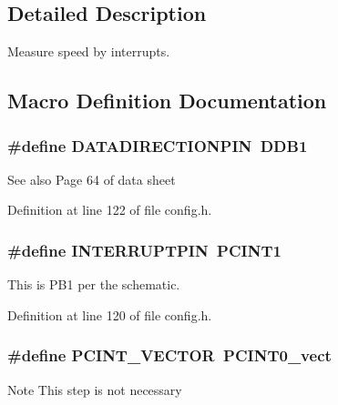 \subsection{Detailed Description}
Measure speed by interrupts. 



\subsection{Macro Definition Documentation}
\subsubsection[{\texorpdfstring{D\+A\+T\+A\+D\+I\+R\+E\+C\+T\+I\+O\+N\+P\+IN}{DATADIRECTIONPIN}}]{\setlength{\rightskip}{0pt plus 5cm}\#define D\+A\+T\+A\+D\+I\+R\+E\+C\+T\+I\+O\+N\+P\+IN~D\+D\+B1}\hypertarget{group__speed_ga9142f4c677315955ad0ac6266b615d2c}{}\label{group__speed_ga9142f4c677315955ad0ac6266b615d2c}
\begin{DoxySeeAlso}{See also}
Page 64 of data sheet 
\end{DoxySeeAlso}


Definition at line 122 of file config.\+h.

\subsubsection[{\texorpdfstring{I\+N\+T\+E\+R\+R\+U\+P\+T\+P\+IN}{INTERRUPTPIN}}]{\setlength{\rightskip}{0pt plus 5cm}\#define I\+N\+T\+E\+R\+R\+U\+P\+T\+P\+IN~P\+C\+I\+N\+T1}\hypertarget{group__speed_ga984097794e94beb18c01b6fcbd8f399d}{}\label{group__speed_ga984097794e94beb18c01b6fcbd8f399d}


This is P\+B1 per the schematic. 



Definition at line 120 of file config.\+h.

\subsubsection[{\texorpdfstring{P\+C\+I\+N\+T\+\_\+\+V\+E\+C\+T\+OR}{PCINT_VECTOR}}]{\setlength{\rightskip}{0pt plus 5cm}\#define P\+C\+I\+N\+T\+\_\+\+V\+E\+C\+T\+OR~P\+C\+I\+N\+T0\+\_\+vect}\hypertarget{group__speed_ga77b45027297b1ff40b5b1249afb852e5}{}\label{group__speed_ga77b45027297b1ff40b5b1249afb852e5}
\begin{DoxyNote}{Note}
This step is not necessary 
\end{DoxyNote}


